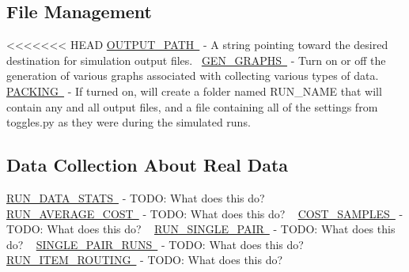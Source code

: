 \hypertarget{toggles_file}{}\subsection{File Management}\label{toggles_file}
<<<<<<< HEAD
\mbox{\hyperlink{namespacedynamicfilterapp_1_1toggles_a04644ded1d5e3fc8bd58a411209b7886}{O\+U\+T\+P\+U\+T\+\_\+\+P\+A\+TH }} -\/ A string pointing toward the desired destination for simulation output files.~\newline
 \mbox{\hyperlink{namespacedynamicfilterapp_1_1toggles_a57c1e3f291181d680f3ee118fa5c4ab8}{G\+E\+N\+\_\+\+G\+R\+A\+P\+HS }} -\/ Turn on or off the generation of various graphs associated with collecting various types of data. ~\newline
 \mbox{\hyperlink{namespacedynamicfilterapp_1_1toggles_a23735ccf05ebd9212e9ebaab8f652507}{P\+A\+C\+K\+I\+NG }} -\/ If turned on, will create a folder named R\+U\+N\+\_\+\+N\+A\+ME that will contain any and all output files, and a file containing all of the settings from toggles.\+py as they were during the simulated runs. ~\newline
 \hypertarget{toggles_data}{}\subsection{Data Collection About Real Data}\label{toggles_data}
\mbox{\hyperlink{namespacedynamicfilterapp_1_1toggles_a36bc09bc8fbde0df2ea1c5d9ed0cf135}{R\+U\+N\+\_\+\+D\+A\+T\+A\+\_\+\+S\+T\+A\+TS }} -\/ T\+O\+DO\+: What does this do? ~\newline
 \mbox{\hyperlink{namespacedynamicfilterapp_1_1toggles_a21f2f0f4c6df7faefb843dd318af3452}{R\+U\+N\+\_\+\+A\+V\+E\+R\+A\+G\+E\+\_\+\+C\+O\+ST }} -\/ T\+O\+DO\+: What does this do? ~\newline
 \mbox{\hyperlink{namespacedynamicfilterapp_1_1toggles_a134ac33ad7706cd6a24fda5b63c73c65}{C\+O\+S\+T\+\_\+\+S\+A\+M\+P\+L\+ES }} -\/ T\+O\+DO\+: What does this do? ~\newline
 \mbox{\hyperlink{namespacedynamicfilterapp_1_1toggles_ab61137c2de5f99b09789a6e76b7cda4c}{R\+U\+N\+\_\+\+S\+I\+N\+G\+L\+E\+\_\+\+P\+A\+IR }} -\/ T\+O\+DO\+: What does this do? ~\newline
 \mbox{\hyperlink{namespacedynamicfilterapp_1_1toggles_a70d4dc65db288020e23ca213cd97c0f8}{S\+I\+N\+G\+L\+E\+\_\+\+P\+A\+I\+R\+\_\+\+R\+U\+NS }} -\/ T\+O\+DO\+: What does this do? ~\newline
 \mbox{\hyperlink{namespacedynamicfilterapp_1_1toggles_a41d76408f27c5889dc3f40f066583a9f}{R\+U\+N\+\_\+\+I\+T\+E\+M\+\_\+\+R\+O\+U\+T\+I\+NG }} -\/ T\+O\+DO\+: What does this do? ~\newline

